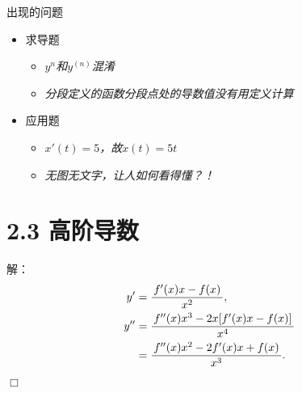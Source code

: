 
\titlepage


\begin{frame}{出现的问题}
	\linespread{1.5}
	  \begin{itemize}[<+-|alert@+>]
	    \item 求导题
	    \begin{itemize}
	      \item \b\it $y^n$和$y^{(n)}$混淆
	      \item \b\it 分段定义的函数分段点处的导数值没有用定义计算
	    \end{itemize}
	    \item 应用题
	    \begin{itemize}
	      \item \b\it $x'(t)=5$，故$x(t)=5t$ \ba{$\times$}
	      \item \b\it 无图无文字，让人如何看得懂？！
	    \end{itemize}
	  \end{itemize}
\end{frame}

\section{2.3 高阶导数}

\begin{frame}
	\linespread{1.5}
	\pause
	
	
	解：\it
	\begin{align*}
		y'&=\displaystyle\frac{\,{f'(x)x-f(x)}\,}{\,{x^2}\,},\\
		y''&=\displaystyle\frac{\,{f''(x)x^3-2x[f'(x)x-f(x)]}\,}{\,{x^4}\,}\\
		&=\displaystyle\frac{\,{f''(x)x^2-2f'(x)x+f(x)}\,}{\,{x^3}\,}.
	\end{align*}
	\hfill$\Box$
\end{frame}

